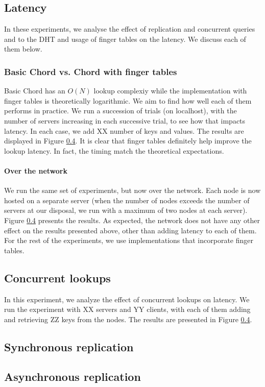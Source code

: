 \documentclass{sig-alternate-10pt}
\begin{document}
\subsection{Latency}
In these experiments, we analyse the effect of replication and concurrent queries and to the DHT and usage of finger tables on the latency. We discuss each of them below.
\subsubsection{Basic Chord vs. Chord with finger tables}
Basic Chord has an $O(N)$ lookup complexiy while the implementation with finger tables is theoretically logarithmic. We aim to find how well each of them performs in practice. We run a succession of trials (on localhost), with the number of servers increasing in each successive trial, to see how that impacts latency. In each case, we add XX number of keys and values. The results are displayed in Figure \ref{}. It is clear that finger tables definitely help improve the lookup latency. In fact, the timing match the theoretical expectations.

\paragraph{Over the network}
We run the same set of experiments, but now over the network. Each node is now hosted on a separate server (when the number of nodes exceeds the number of servers at our disposal, we run with a maximum of two nodes at each server). Figure \ref{} presents the results. As expected, the network does not have any other effect on the results presented above, other than adding latency to each of them.
For the rest of the experiments, we use implementations that incorporate finger tables.

\subsection{Concurrent lookups}
In this experiment, we analyze the effect of concurrent lookups on latency. We run the experiment with XX servers and YY clients, with each of them adding and retrieving ZZ keys from the nodes. The results are presented in Figure \ref{}.


\subsection{Synchronous replication}

\subsection{Asynchronous replication}
\end{document}
